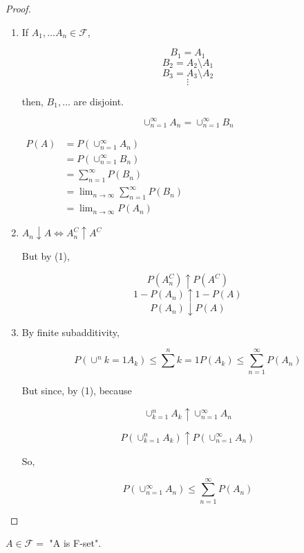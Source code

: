 \documentclass[11pt,fleqn]{book} %
\begin{document}
 \begin{proof}

 \begin{enumerate}
 	\item If $A_1, \dots A_n \in \mathscr{F}$,

		$$B_1 = A_1 $$
		$$B_2 = A_2 \setminus A_1$$
		$$B_3 = A_3 \setminus A_2$$
		$$\vdots $$

		then, $B_1, \dots$ are disjoint. 

		$$\displaystyle \cup^\infty_{n=1} A_n = \displaystyle \cup^\infty_{n=1} B_n $$

		$\begin{aligned}
			P(A) &= P(\displaystyle \cup^\infty_{n=1} A_n) \\
		&= P(\displaystyle \cup^\infty_{n=1} B_n ) \\
		&= \displaystyle \sum^\infty_{n=1} P(B_n) \\
		&= \lim_{n \rightarrow \infty} \displaystyle \sum^\infty_{n=1} P(B_n)\\ 
		&= \lim_{n \rightarrow \infty} P(A_n)
		\end{aligned}
		$

	\item $A_n \downarrow A \Leftrightarrow A_n^C \uparrow A^C$

	But by (1), 

	$$P(A_n^C) \uparrow P(A^C)$$
	$$1 - P(A_n) \uparrow 1 - P(A)$$
	$$P(A_n) \downarrow P(A)$$


	\item By finite subadditivity, 

	$$ P(\displaystyle \cup^n{k=1} A_k) \leq \displaystyle \sum^n{k=1} P(A_k) \leq \displaystyle \sum^\infty_{n=1} P(A_n)$$

	But since, by (1), because

	$$\displaystyle \cup^n_{k=1} A_k \uparrow \displaystyle \cup^\infty_{n=1} A_n$$

	$$P(\displaystyle \cup^n_{k=1} A_k) \uparrow P(\displaystyle \cup^\infty_{n=1} A_n)$$

	So, 

	$$P(\displaystyle \cup^\infty_{n=1} A_n) \leq
		 \displaystyle \sum^\infty_{n=1} P(A_n)$$


 \end{enumerate}
\end{proof}

\begin{remark}
	$A \in \mathscr{F} =$ "A is F-set".
\end{remark}
\end{document}
